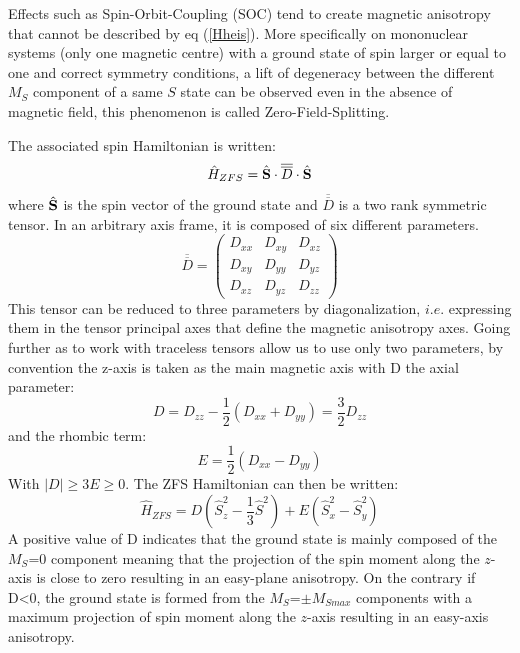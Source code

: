 \documentclass[12pt]{report}
\numberwithin{equation}{section}
\begin{document}
\par Effects such as Spin-Orbit-Coupling (SOC) tend to create magnetic anisotropy that cannot be described by eq (\ref{Hheis}). 
More specifically on mononuclear systems (only one magnetic centre) with a ground state of spin larger or equal to one and correct symmetry conditions, a lift of degeneracy between the different $M_S$ component of a same $S$ state can be observed even in the absence of magnetic field, this phenomenon is called Zero-Field-Splitting.

The associated spin Hamiltonian is written:
\begin{equation}\label{SDS}
    \hat{H}_{ZFS}=\hat{\vb S} \cdot \overline{\overline{D}} \cdot \hat{\vb S}
\end{equation}
where $\hat{\vb S}$ is the spin vector of the ground state and $\overline{\overline{D}}$ is a two rank symmetric tensor. In an arbitrary axis frame, it is composed of six different parameters.
\begin{equation}
    \overline{\overline{D}}=\begin{pmatrix}
        D_{xx} & D_{xy} & D_{xz}\\
        D_{xy} & D_{yy} & D_{yz}\\
        D_{xz} & D_{yz} & D_{zz}
    \end{pmatrix}
\end{equation}
This tensor can be reduced to three parameters by diagonalization, $\textit{i.e.}$ expressing them in the tensor principal axes that define the magnetic anisotropy axes.
Going further as to work with traceless tensors allow us to use only two parameters, by convention the z-axis is taken as the main magnetic axis with D the axial parameter:
\begin{equation}\label{ParametreD}
    D=D_{zz}-\frac{1}{2}(D_{xx}+D_{yy})=\frac{3}{2}D_{zz}
\end{equation}
and the rhombic term:
\begin{equation}\label{ParametreE}
    E=\frac{1}{2}(D_{xx}-D_{yy})
\end{equation}
With $|D| \geq 3E \geq 0$. 
The ZFS Hamiltonian can then be written:
\begin{equation}\label{HZFS}
    \hat{H}_{ZFS}=D (\hat{S}_z^2-\frac{1}{3}\hat{S}^2)+E(\hat{S}_x^2-\hat{S}_y^2)
\end{equation}
A positive value of D indicates that the ground state is mainly composed of the $M_S$=0 component meaning that the projection of the spin moment along the $z$-axis is close to zero resulting in an easy-plane anisotropy. 
On the contrary if D<0, the ground state is formed from the $M_S$=$\pm M_{Smax}$ components with a maximum projection of spin moment along the $z$-axis resulting in an easy-axis anisotropy.
\end{document}
